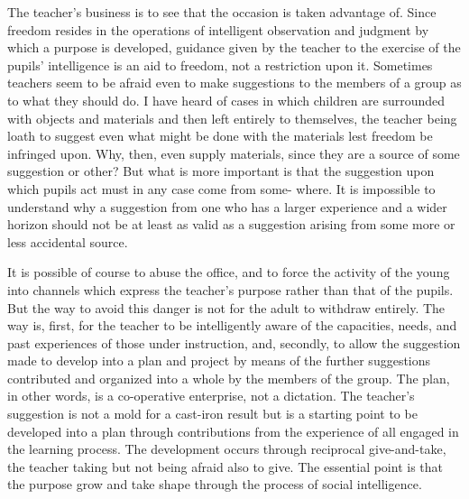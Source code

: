 The teacher's business is to see that the occasion is taken advantage of. Since freedom 
resides in the operations of intelligent observation and judgment by which a purpose is 
developed, guidance given by the teacher to the exercise of the pupils' intelligence is an 
aid to freedom, not a restriction upon it. Sometimes teachers seem to be afraid even to 
make suggestions to the members of a group as to what they should do. I have heard of 
cases in which children are surrounded with objects and materials and then left entirely to 
themselves, the teacher being loath to suggest even what might be done with the 
materials lest freedom be infringed upon. Why, then, even supply materials, since they 
are a source of some suggestion or other? But what is more important is that the 
suggestion upon which pupils act must in any case come from some- where. It is 
impossible to understand why a suggestion from one who has a larger experience and a 
wider horizon should not be at least as valid as a suggestion arising from some more or 
less accidental source. 

It is possible of course to abuse the office, and to force the activity of the young into 
channels which express the teacher's purpose rather than that of the pupils. But the way to 
avoid this danger is not for the adult to withdraw entirely. The way is, first, for the 
teacher to be intelligently aware of the capacities, needs, and past experiences of those 
under instruction, and, secondly, to allow the suggestion made to develop into a plan and 
project by means of the further suggestions contributed and organized into a whole by the 
members of the group. The plan, in other words, is a co-operative enterprise, not a 
dictation. The teacher's suggestion is not a mold for a cast-iron result but is a starting point 
to be developed into a plan through contributions from the experience of all engaged in 
the learning process. The development occurs through reciprocal give-and-take, the 
teacher taking but not being afraid also to give. The essential point is that the purpose 
grow and take shape through the process of social intelligence. 